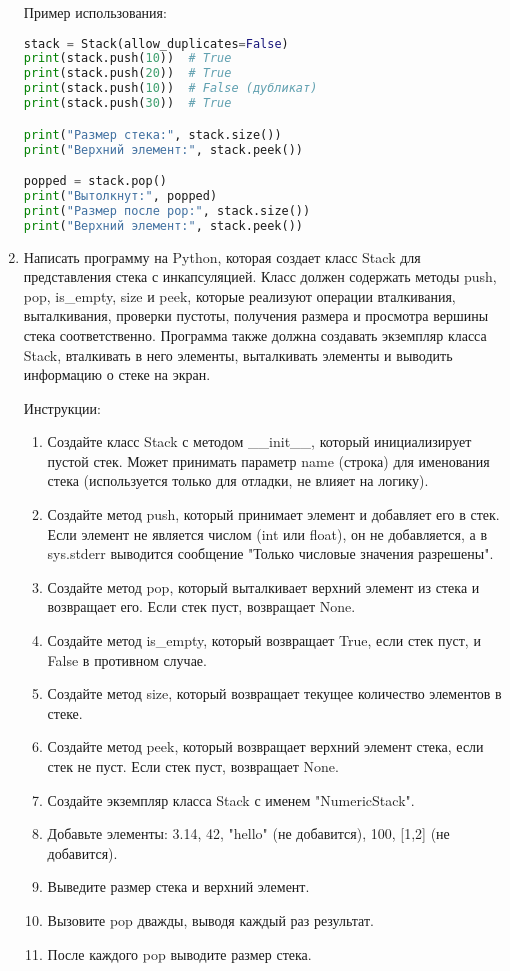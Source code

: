 \begin{enumerate}
Пример использования:
\begin{lstlisting}[language=Python]
stack = Stack(allow_duplicates=False)
print(stack.push(10))  # True
print(stack.push(20))  # True
print(stack.push(10))  # False (дубликат)
print(stack.push(30))  # True

print("Размер стека:", stack.size())
print("Верхний элемент:", stack.peek())

popped = stack.pop()
print("Вытолкнут:", popped)
print("Размер после pop:", stack.size())
print("Верхний элемент:", stack.peek())
\end{lstlisting}

\item Написать программу на Python, которая создает класс Stack для представления стека с инкапсуляцией. Класс должен содержать методы push, pop, is\_empty, size и peek, которые реализуют операции вталкивания, выталкивания, проверки пустоты, получения размера и просмотра вершины стека соответственно. Программа также должна создавать экземпляр класса Stack, вталкивать в него элементы, выталкивать элементы и выводить информацию о стеке на экран.

Инструкции:
\begin{enumerate}
    \item Создайте класс Stack с методом \_\_init\_\_, который инициализирует пустой стек. Может принимать параметр name (строка) для именования стека (используется только для отладки, не влияет на логику).
    \item Создайте метод push, который принимает элемент и добавляет его в стек. Если элемент не является числом (int или float), он не добавляется, а в sys.stderr выводится сообщение "Только числовые значения разрешены".
    \item Создайте метод pop, который выталкивает верхний элемент из стека и возвращает его. Если стек пуст, возвращает None.
    \item Создайте метод is\_empty, который возвращает True, если стек пуст, и False в противном случае.
    \item Создайте метод size, который возвращает текущее количество элементов в стеке.
    \item Создайте метод peek, который возвращает верхний элемент стека, если стек не пуст. Если стек пуст, возвращает None.
    \item Создайте экземпляр класса Stack с именем "NumericStack".
    \item Добавьте элементы: 3.14, 42, "hello" (не добавится), 100, [1,2] (не добавится).
    \item Выведите размер стека и верхний элемент.
    \item Вызовите pop дважды, выводя каждый раз результат.
    \item После каждого pop выводите размер стека.
\end{enumerate}


\end{enumerate}
